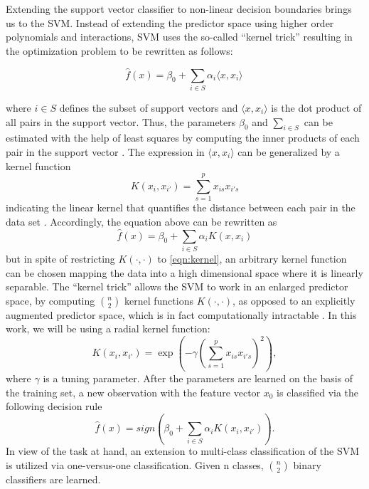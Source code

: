 Extending the support vector classifier to non-linear decision boundaries brings us to the SVM. Instead of extending the predictor space using higher order polynomials and interactions, SVM uses the so-called ``kernel trick'' \cite{efron_hastie_2016} resulting in the optimization problem to be rewritten as follows:

\begin{equation}
  \hat f(x) = \beta_0 + \sum_{i \in S} \alpha_i \langle x, x_i \rangle \,
\end{equation}

where $i \in S$ defines the subset of support vectors and $\langle x, x_i \rangle$ is the dot product of all pairs in the support vector. Thus, the parameters $\beta_0$ and $\sum_{i \in S}$ can be estimated with the help of least squares by computing the inner products of each pair in the support vector \cite{efron_hastie_2016}. The expression in $\langle x, x_i \rangle$ can be generalized by a kernel function
\begin{equation} \label{eqn:kernel}
  K(x_i,x_{i'}) = \sum_{s=1}^{p} x_{is} x_{i's}
\end{equation}
indicating the linear kernel that quantifies the distance between each pair in the data set \cite{James:2014:ISL:2517747}. Accordingly, the equation above can be rewritten as
\begin{equation}
  \hat f(x) = \beta_0 + \sum_{i \in S} \alpha_i K(x, x_i)
\end{equation}
but in spite of restricting $K(\cdot, \cdot)$ to \ref{eqn:kernel}, an arbitrary kernel function can be chosen mapping the data into a high dimensional space where it is linearly separable. The ``kernel trick'' allows the SVM to work in an enlarged predictor space, by computing $\binom{n}{2}$ kernel functions $K(\cdot, \cdot)$, as opposed to an explicitly augmented predictor space, which is in fact computationally intractable \cite{James:2014:ISL:2517747}. In this work, we will be using a radial kernel function:
\begin{equation}
  K(x_i,x_{i'}) = \exp(-\gamma(\sum_{s=1}^{p}x_{is}x_{i's})^2),
\end{equation}
where $\gamma$ is a tuning parameter. After the parameters are learned on the basis of the training set, a new observation with the feature vector $x_0$ is classified via the following decision rule
\begin{equation}
  \hat f(x) = sign(\beta_0 + \sum_{i \in S} \alpha_i K(x_i, x_{i'})).
\end{equation}
In view of the task at hand, an extension to multi-class classification of the SVM is utilized via one-versus-one classification. Given n classes, $\binom{n}{2}$ binary classifiers are learned.

